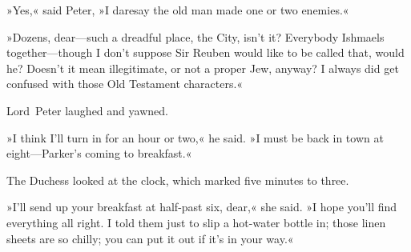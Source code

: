 »Yes,« said Peter, »I daresay the old man made one or two enemies.«

»Dozens, dear—such a dreadful place, the City, isn't it? Everybody Ishmaels together—though I don't suppose Sir Reuben would like to be called that, would he? Doesn't it mean illegitimate, or not a proper Jew, anyway? I always did get confused with those Old Testament characters.«

Lord~Peter laughed and yawned.

»I think I'll turn in for an hour or two,« he said. »I must be back in town at eight—Parker's coming to breakfast.«

The Duchess looked at the clock, which marked five minutes to three.

»I'll send up your breakfast at half-past six, dear,« she said. »I hope you'll find everything all right. I told them just to slip a hot-water bottle in; those linen sheets are so chilly; you can put it out if it's in your way.«
